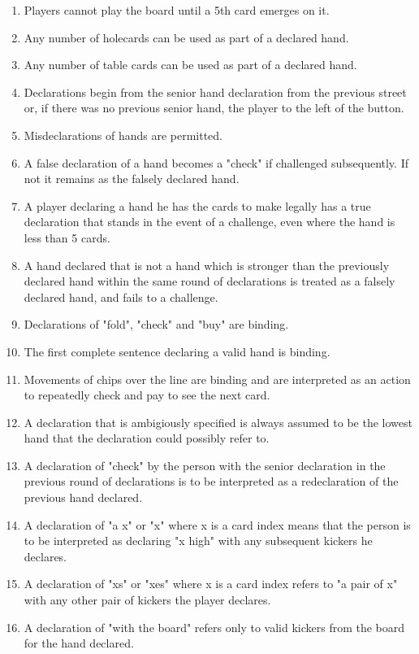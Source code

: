 \documentclass[a4paper,12pt]{article}
\begin{document}
\begin{enumerate}
\item Players cannot play the board until a 5th card emerges on it.
\item Any number of holecards can be used as part of a declared hand.
\item Any number of table cards can be used as part of a declared hand.
\item Declarations begin from the senior hand declaration from the previous street or, if there was no previous senior hand, the player to the left of the button.
\item Misdeclarations of hands are permitted.
\item A false declaration of a hand becomes a "check" if challenged subsequently. If not it remains as the falsely declared hand.
\item A player declaring a hand he has the cards to make legally has a true declaration that stands in the event of a challenge, even where the hand is less than 5 cards.
\item A hand declared that is not a hand which is stronger than the previously declared hand within the same round of declarations is treated as a falsely declared hand, and fails to a challenge.
\item Declarations of "fold", "check" and "buy" are binding.
\item The first complete sentence declaring a valid hand is binding.
\item Movements of chips over the line are binding and are interpreted as an action to repeatedly check and pay to see the next card.
\item A declaration that is ambigiously specified is always assumed to be the lowest hand that the declaration could possibly refer to.
\item A declaration of "check" by the person with the senior declaration in the previous round of declarations is to be interpreted as a redeclaration of the previous hand declared.
\item A declaration of "a x" or "x" where x is a card index means that the person is to be interpreted as declaring "x high" with any subsequent kickers he declares.
\item A declaration of "xs" or "xes" where x is a card index refers to "a pair of x" with any other pair of kickers the player declares.
\item A declaration of "with the board" refers only to valid kickers from the board for the hand declared.

\end{enumerate}
\end{document}
